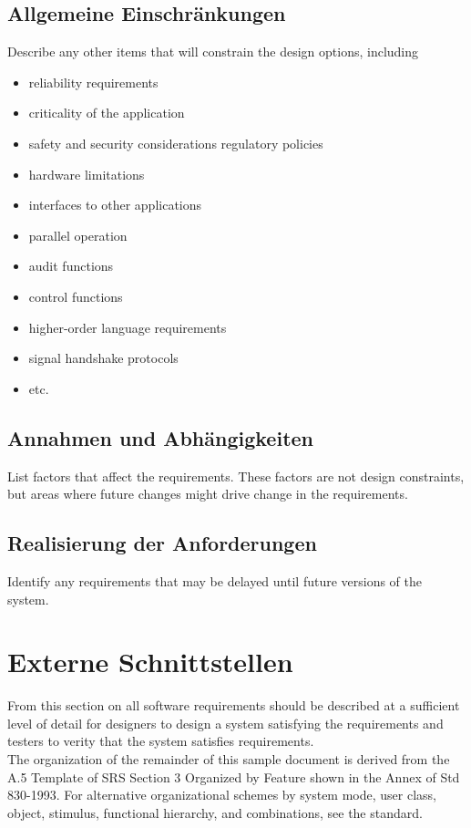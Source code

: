 \subsection{Allgemeine Einschränkungen}
Describe any other items that will constrain the design options, including
\begin{itemize}
	\item reliability requirements
	\item criticality of the application
	\item safety and security considerations regulatory policies
	\item hardware limitations
	\item interfaces to other applications
	\item parallel operation
	\item audit functions
	\item control functions
	\item higher-order language requirements
	\item signal handshake protocols
	\item etc.
\end{itemize}

\subsection{Annahmen und Abhängigkeiten}
List factors that affect the requirements. These factors are not design constraints, but areas where future changes might drive change in the requirements.

\subsection{Realisierung der Anforderungen}
Identify any requirements that may be delayed until future versions of the system.

\newpage

\section{Externe Schnittstellen}
From this section on all software requirements should be described at a sufficient level of detail for designers to design a system satisfying the requirements and testers to verity that the system satisfies requirements. \\[-0.3cm]

\noindent The organization of the remainder of this sample document is derived from the A.5 Template of SRS Section 3 Organized by Feature shown in the Annex of Std 830-1993. For alternative organizational schemes by system mode, user class, object, stimulus, functional hierarchy, and combinations, see the standard. \\[-0.3cm]

